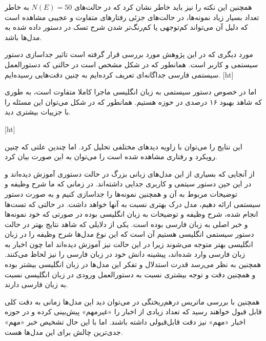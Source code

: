 همچنین این نکته را نیز باید خاطر نشان کرد که در حالت‌های
$N(E) = 50$
به خاطر تعداد بسیار زیاد نمونه‌ها، در حالت‌های جزئی رفتارهای متفاوت و عجیبی مشاهده است که دلیل آن می‌تواند کم‌توجهی یا کم‌رنگ‌تر شدن شرح تسک در دستور داده شده به مدل‌ها باشد.

مورد دیگری که در این پژوهش مورد بررسی قرار گرفته است تاثیر جداسازی دستور سیستمی و کاربر است. همانطور که در شکل  مشخص است در حالتی که دستورالعمل سیستمی فارسی جداگانه‌ای تعریف کرده‌ایم به چنین دقت‌هایی رسیده‌ایم.
\pagebreak
{}[ht]

اما در خصوص دستور سیستمی به زبان انگلیسی ماجرا کاملا متفاوت است، به طوری که شاهد بهبود ۱۶ درصدی در حوزه
هستیم. همانطور که در شکل  می‌توان این مسئله را با جزییات بیشتری دید.

[ht]

این نتایج را می‌توان با زاویه‌ دیدهای مختلفی تحلیل کرد. اما چندین علتی که چنین رویکرد و رفتاری مشاهده شده است را می‌توان به این صورت بیان کرد.

از آنجایی که بسیاری از این مدل‌های زبانی بزرگ در حالت دستوری آموزش دیده‌اند و در این حین دستور سیتمی و کاربری جدایی داشته‌اند. در زمانی که ما شرح وظیفه و توضیحات مربوط به آن و همچنین نمونه‌ها را جداسازی کنیم و به صورت دستور سیستمی ارائه دهیم، مدل درک بهتری نسبت به آنها خواهد داشت.
در حالتی که تست‌ها انجام شده، شرح وظیفه و توضیحات به زبان انگلیسی بوده در صورتی که خود نمونه‌ها و خبر اصلی به زبان فارسی بوده است. یکی از دلایلی که شاهد نتایج بهتر در حالت دستور سیستمی انگلیسی هستیم آن است که این نوع مدل‌ها شرح وظیفه را در زبان انگلیسی بهتر متوجه می‌شوند زیرا در این حالت نیز آموزش دیده‌اند اما چون اخبار به زبان فارسی وارد شده‌اند، پیشینه دانش خود در زبان فارسی را نیز لحاظ می‌کنند.
همچنین به نظر می‌رسد قدرت استدلال و تفکر این مدل‌ها در زبان انگلیسی بیشتر بوده و همچنین دقت و توجه‌ بیشتری نسبت به دستورالعمل ورودی در زبان انگلیسی نسبت به زبان فارسی دارند.

همچنین با بررسی ماتریس درهم‌ریختگی در  می‌توان دید این مدل‌ها زمانی به دقت کلی قابل قبول خواهند رسید که تعداد زیادی از اخبار را «غیرمهم» پیش‌بینی کرده و در حوزه اخبار «مهم» نیز دقت قابل‌قبولی داشته‌ باشند. اما با این حال تشخیص خبر «مهم» جدی‌ترین چالش برای این مدل‌ها هست.


